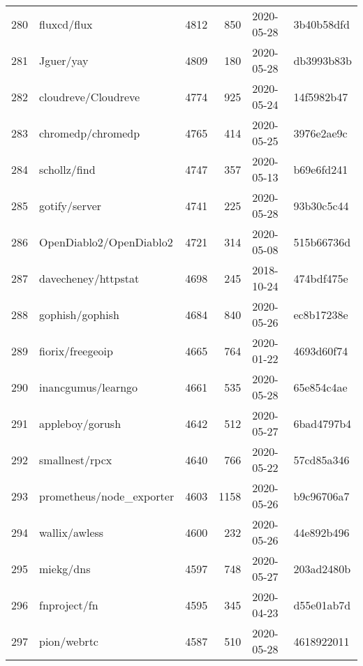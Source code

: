 \begin{longtable}{llrrll}
    280 &                                        fluxcd/flux &   4812 &    850 & 2020-05-28 &  3b40b58dfd \\
    281 &                                          Jguer/yay &   4809 &    180 & 2020-05-28 &  db3993b83b \\
    282 &                                cloudreve/Cloudreve &   4774 &    925 & 2020-05-24 &  14f5982b47 \\
    283 &                                  chromedp/chromedp &   4765 &    414 & 2020-05-25 &  3976e2ae9c \\
    284 &                                       schollz/find &   4747 &    357 & 2020-05-13 &  b69e6fd241 \\
    285 &                                      gotify/server &   4741 &    225 & 2020-05-28 &  93b30c5c44 \\
    286 &                            OpenDiablo2/OpenDiablo2 &   4721 &    314 & 2020-05-08 &  515b66736d \\
    287 &                                davecheney/httpstat &   4698 &    245 & 2018-10-24 &  474bdf475e \\
    288 &                                    gophish/gophish &   4684 &    840 & 2020-05-26 &  ec8b17238e \\
    289 &                                   fiorix/freegeoip &   4665 &    764 & 2020-01-22 &  4693d60f74 \\
    290 &                                 inancgumus/learngo &   4661 &    535 & 2020-05-28 &  65e854c4ae \\
    291 &                                    appleboy/gorush &   4642 &    512 & 2020-05-27 &  6bad4797b4 \\
    292 &                                     smallnest/rpcx &   4640 &    766 & 2020-05-22 &  57cd85a346 \\
    293 &                           prometheus/node\_exporter &   4603 &   1158 & 2020-05-26 &  b9c96706a7 \\
    294 &                                      wallix/awless &   4600 &    232 & 2020-05-26 &  44e892b496 \\
    295 &                                          miekg/dns &   4597 &    748 & 2020-05-27 &  203ad2480b \\
    296 &                                       fnproject/fn &   4595 &    345 & 2020-04-23 &  d55e01ab7d \\
    297 &                                        pion/webrtc &   4587 &    510 & 2020-05-28 &  4618922011 \\

\end{longtable}
